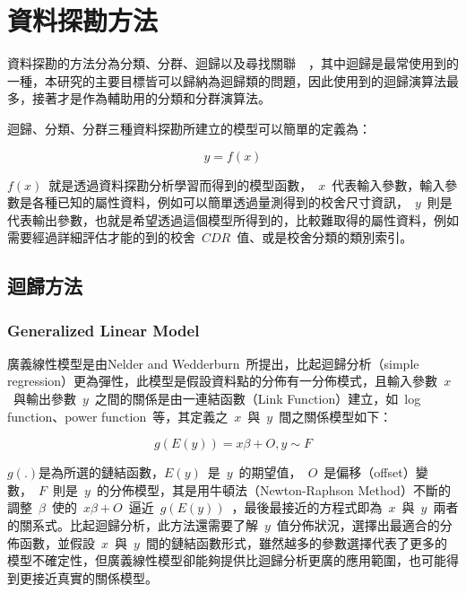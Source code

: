 
\section{資料探勘方法}

資料探勘的方法分為分類、分群、迴歸以及尋找關聯~\cite{fayyad1996data}~，其中迴歸是最常使用到的一種，本研究的主要目標皆可以歸納為迴歸類的問題，因此使用到的迴歸演算法最多，接著才是作為輔助用的分類和分群演算法。

迴歸、分類、分群三種資料探勘所建立的模型可以簡單的定義為：

\begin{equation} y = f(x) \label{eq:ModelEqu}\end{equation} 

$f(x)$~就是透過資料探勘分析學習而得到的模型函數，~$x$~代表輸入參數，輸入參數是各種已知的屬性資料，例如可以簡單透過量測得到的校舍尺寸資訊，~$y$~則是代表輸出參數，也就是希望透過這個模型所得到的，比較難取得的屬性資料，例如需要經過詳細評估才能的到的校舍~$CDR$~值、或是校舍分類的類別索引。

\subsection{迴歸方法}

\subsubsection{Generalized Linear Model}

廣義線性模型是由Nelder and Wedderburn~\cite{citeulike:5485398}所提出，比起迴歸分析（simple regression）更為彈性，此模型是假設資料點的分佈有一分佈模式，且輸入參數~$x$~與輸出參數~$y$~之間的關係是由一連結函數（Link Function）建立，如~log function、power function~等，其定義之~$x$~與~$y$~間之關係模型如下：


\begin{equation} g(E(y)) = x\beta + O, y \sim F \label{eq:GLM}\end{equation} 

$g(.)$是為所選的鏈結函數，$E(y)$~是~$y$~的期望值，~$O$~是偏移（offset）變數，~$F$~則是~$y$~的分佈模型，其是用牛頓法（Newton-Raphson Method）不斷的調整~$\beta$~使的~$x\beta + O$~逼近~$g(E(y))$~，最後最接近的方程式即為~$x$~與~$y$~兩者的關系式。比起迴歸分析，此方法還需要了解~$y$~值分佈狀況，選擇出最適合的分佈函數，並假設~$x$~與~$y$~間的鏈結函數形式，雖然越多的參數選擇代表了更多的模型不確定性，但廣義線性模型卻能夠提供比迴歸分析更廣的應用範圍，也可能得到更接近真實的關係模型。


